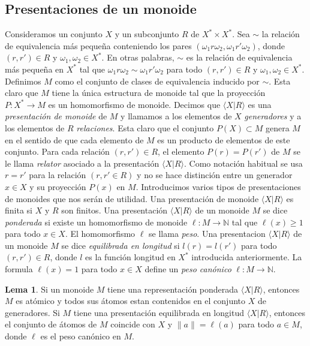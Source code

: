 \documentclass[12pt]{article}
\theoremstyle{definition}
\newtheorem{lema}{Lema}[section]
\providecommand{\norm}[1]{\lVert#1\rVert}
\begin{document}
\subsection{Presentaciones de un monoide}
Consideramos un conjunto $X$ y un subconjunto $R$ de $X^*\times X^*$. Sea $\sim$ la relación de equivalencia más pequeña conteniendo los pares $(\omega_1r\omega_2, \omega_1r'\omega_2)$, donde $(r,r')\in R$ y $\omega_1,\omega_2\in X^*$. En otras palabras, $\sim$ es la relación de equivalencia más pequeña en $X^*$ tal que $\omega_1r\omega_2\sim\omega_1r'\omega_2$ para todo $(r,r')\in R$ y $\omega_1,\omega_2\in X^*$. Definimos $M$ como el conjunto de clases de equivalencia inducido por $\sim$. Esta claro que $M$ tiene la única estructura de monoide tal que la proyección $P:X^*\rightarrow M$ es un homomorfismo de monoide. Decimos que $\langle X|R\rangle$ es una \textit{presentación de monoide} de $M$ y llamamos a los elementos de $X$ \textit{generadores} y a los elementos de $R$ \textit{relaciones}.
\newline
\newline
Esta claro que el conjunto $P(X)\subset M$ genera $M$ en el sentido de que cada elemento de $M$ es un producto de elementos de este conjunto. Para cada relación $(r,r')\in R$, el elemento $P(r)=P(r')$ de $M$ se le llama \textit{relator} asociado a la presentación $\langle X|R\rangle$. Como notación habitual se usa $r=r'$ para la relación $(r,r'\in R)$ y no se hace distinción entre un generador $x\in X$ y su proyección $P(x)$ en $M$.
\newline
\newline
Introducimos varios tipos de presentaciones de monoides que nos serán de utilidad. Una presentación de monoide $\langle X|R\rangle$ es finita si $X$ y $R$ son finitos. Una presentación $\langle X|R\rangle$ de un monoide $M$ se dice \textit{ponderada} si existe un homomorfismo de monoide $\ell:M\rightarrow \mathbb{N}$ tal que $\ell(x)\geq 1$ para todo $x\in X$. El homomorfismo $\ell$ se llama \textit{peso}.
\newline
\newline
Una presentacion $\langle X|R\rangle$ de un monoide $M$ se dice \textit{equilibrada en longitud} si $l(r)=l(r')$ para todo $(r,r')\in R$, donde $l$ es la función longitud en $X^*$ introducida anteriormente. La formula $\ell(x)=1$ para todo $x\in X$ define un \textit{peso canónico} $\ell:M\rightarrow \mathbb{N}$.

\begin{lema}
Si un monoide $M$ tiene una representación ponderada $\langle X|R\rangle$, entonces $M$ es atómico y todos sus átomos estan contenidos en el conjunto $X$ de generadores. Si $M$ tiene una presentación equilibrada en longitud $\langle X|R\rangle$, entonces el conjunto de átomos de $M$ coincide con $X$ y $\norm{a}=\ell(a)$ para todo $a\in M$, donde $\ell$ es el peso canónico en $M$.
\label{lema:presen_mono}
\end{lema}
\end{document}
